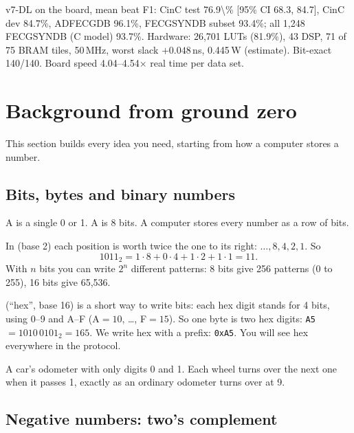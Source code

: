 \documentclass[11pt]{article}
\begin{document}
\begin{keyfact}
v7-DL on the board, mean beat F1: CinC test \num{76.9\%} [95\% CI 68.3, 84.7], CinC dev 84.7\%, ADFECGDB 96.1\%, FECGSYNDB subset 93.4\%; all 1,248 FECGSYNDB (C model) 93.7\%. Hardware: 26,701 LUTs (81.9\%), 43 DSP, 71 of 75 BRAM tiles, 50\,MHz, worst slack $+0.048$\,ns, 0.445\,W (estimate). Bit-exact 140/140. Board speed 4.04--4.54$\times$ real time per data set.
\end{keyfact}

\section{Background from ground zero}
\label{sec:ground}

This section builds every idea you need, starting from how a computer stores a number.

\subsection{Bits, bytes and binary numbers}

A  is a single 0 or 1. A  is 8 bits. A computer stores every number as a row of bits.

In  (base 2) each position is worth twice the one to its right: $\dots, 8, 4, 2, 1$. So
\[
1011_2 = 1\cdot 8 + 0\cdot 4 + 1 \cdot 2 + 1 \cdot 1 = 11.
\]
With $n$ bits you can write $2^n$ different patterns: 8 bits give 256 patterns (0 to 255), 16 bits give 65,536.

 (``hex'', base 16) is a short way to write bits: each hex digit stands for 4 bits, using 0--9 and A--F (A$=10$, \dots, F$=15$). So one byte is two hex digits: \texttt{A5} $= 1010\,0101_2 = 165$. We write hex with a prefix: \texttt{0xA5}. You will see hex everywhere in the protocol.

\begin{analogy}
A car's odometer with only digits 0 and 1. Each wheel turns over the next one when it passes 1, exactly as an ordinary odometer turns over at 9.
\end{analogy}

\subsection{Negative numbers: two's complement}
\end{document}
